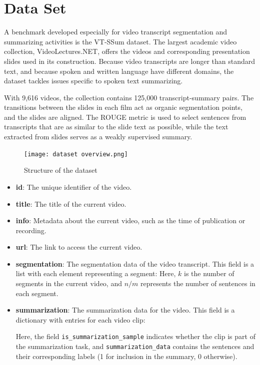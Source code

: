 \documentclass[conference]{IEEEtran}
\begin{document}
\section{Data Set}
A benchmark developed especially for video transcript segmentation and summarizing activities is the VT-SSum dataset. The largest academic video collection, VideoLectures.NET, offers the videos and corresponding presentation slides used in its construction. Because video transcripts are longer than standard text, and because spoken and written language have different domains, the dataset tackles issues specific to spoken text summarizing.

With 9,616 videos, the collection contains 125,000 transcript-summary pairs. The transitions between the slides in each film act as organic segmentation points, and the slides are aligned. The ROUGE metric is used to select sentences from transcripts that are as similar to the slide text as possible, while the text extracted from slides serves as a weakly supervised summary.

\begin{figure}[htbp]
    \centering
    \texttt{[image: dataset overview.png]} %
    \caption{Structure of the dataset}
    \label{fig:dataset_structure}
\end{figure}

\begin{itemize}
    \item \textbf{id}: The unique identifier of the video.
    \item \textbf{title}: The title of the current video.
    \item \textbf{info}: Metadata about the current video, such as the time of publication or recording.
    \item \textbf{url}: The link to access the current video.
    \item \textbf{segmentation}: The segmentation data of the video transcript. This field is a list with each element representing a segment:
    Here, $k$ is the number of segments in the current video, and $n/m$ represents the number of sentences in each segment.

    \item \textbf{summarization}: The summarization data for the video. This field is a dictionary with entries for each video clip:
    
    Here, the field \texttt{is\_summarization\_sample} indicates whether the clip is part of the summarization task, and \texttt{summarization\_data} contains the sentences and their corresponding labels (1 for inclusion in the summary, 0 otherwise).
\end{itemize}
\end{document}
